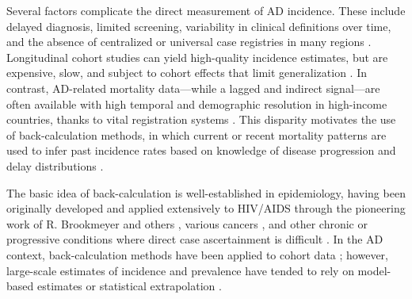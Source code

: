 \documentclass{article}
\begin{document}
Several factors complicate the direct measurement of AD incidence. These include delayed diagnosis, limited screening, variability in clinical definitions over time, and the absence of centralized or universal case registries in many regions \cite{gustavsson2023global, tahami2022alzheimer, monfared2024prevalence}. Longitudinal cohort studies can yield high-quality incidence estimates, but are expensive, slow, and subject to cohort effects that limit generalization \cite{joling2020time}. In contrast, AD-related mortality data—while a lagged and indirect signal—are often available with high temporal and demographic resolution in high-income countries, thanks to vital registration systems \cite{cdc_wonder,brown2024trends, romero2014under,stokes2020estimates}. This disparity motivates the use of back-calculation methods, in which current or recent mortality patterns are used to infer past incidence rates based on knowledge of disease progression and delay distributions \cite{egan2015review}.

The basic idea of back-calculation is well-established in epidemiology, having been originally developed and applied extensively to HIV/AIDS through the pioneering work of R. Brookmeyer and others \cite{brookmeyer1989statistical, brookmeyer1991reconstruction, song2017using, viguerie2023isolating, viguerie2024covid}, various cancers \cite{nautiyal2018spatiotemporal, ventura2014estimating, mariotto2017estimation}, and other chronic or progressive conditions where direct case ascertainment is difficult \cite{de2004estimating,trubnikov2014estimated}. In the AD context, back-calculation methods have been applied to cohort data \cite{yu2011estimating}; however, large-scale estimates of incidence and prevalence have tended to rely on model-based estimates or statistical extrapolation \cite{rajan2021population, brookmeyer1991reconstruction, rommel2025dementia,raggi2022incidence, monfared2024prevalence}. 
\end{document}
